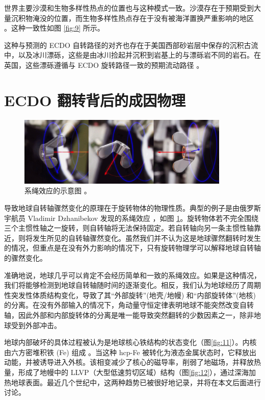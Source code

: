 \documentclass[10pt,twocolumn,letterpaper]{article}
\begin{document}
世界主要沙漠和生物多样性热点的位置也与这种模式一致。沙漠存在于预期受到大量沉积物淹没的位置，而生物多样性热点存在于没有被海洋置换严重影响的地区 \cite{28}。这种一致性如图 \ref{fig:9} 所示。

这种与预测的 ECDO 自转路径的对齐也存在于美国西部砂岩层中保存的沉积古流中，以及冰川漂砾，这些是由冰川捡起并沉积到岩基上的与漂砾岩不同的岩石。在英国，这些漂砾遵循与 ECDO 旋转路径一致的预期流动路径 \cite{67,68}。

\section{ECDO 翻转背后的成因物理}

\begin{figure}[t]
\begin{center}
\includegraphics[width=0.9\textwidth]{dzhani.jpg}
\end{center}
   \caption{系绳效应的示意图 \cite{28}。}
\label{fig:10}
\end{figure}

导致地球自转轴骤然变化的原理在于旋转物体的物理性质。典型的例子是由俄罗斯宇航员 Vladimir Dzhanibekov 发现的系绳效应 \cite{37}，如图 \ref{fig:10}。旋转物体若不完全围绕三个主惯性轴之一旋转，则自转轴将无法保持固定。若自转轴向另一条主惯性轴靠近，则将发生所见的自转轴骤然变化。虽然我们并不认为这是地球骤然翻转时发生的情况，但重点是在没有外力影响的情况下，只有旋转物理学可以解释地球自转轴的骤然变化。

准确地说，地球几乎可以肯定不会经历简单和一致的系绳效应。如果是这种情况，我们将能够检测到地球自转轴随时间的逐渐变化。相反，我们认为地球经历了周期性突发性体质结构变化，导致了其“外部旋转”(地壳/地幔) 和“内部旋转体”(地核) 的分离。在没有外部输入的情况下，角动量守恒定律表明地球不能突然改变自转轴，因此外部和内部旋转体的分离是唯一能导致突然翻转的少数因素之一，除非地球受到外部冲击。

地球内部破坏的具体过程被认为是地球核心铁结构的状态变化（图\ref{fig:11}）。内核由六方密堆积铁 (Fe) 组成 \cite{141}。当这种 hcp-Fe 被转化为液态金属状态时，它释放出动能，并被诱导进入外核。该相变减少了核心的磁导率，削弱了地磁场，并释放热量，形成了地幔中的 LLVP（大型低速剪切区域）结构（图\ref{fig:12}）\cite{38}，通过深海加热地球表面。最近几个世纪中，这两种趋势已被很好地记录，并将在本文后面进行讨论。
\end{document}
